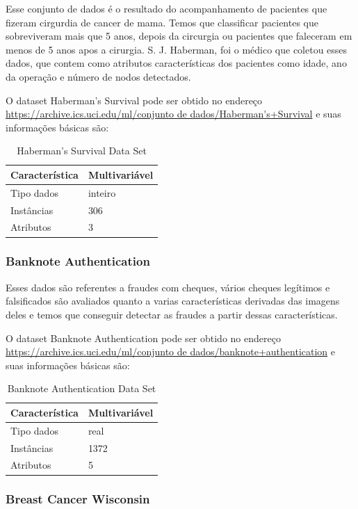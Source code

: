 \documentclass[12pt, a4paper]{article}
\begin{document}
Esse conjunto de dados é o resultado do acompanhamento de pacientes que fizeram cirgurdia de cancer de mama. Temos que classificar pacientes que sobreviveram mais que 5 anos, depois da circurgia ou pacientes que faleceram em menos de 5 anos apos a cirurgia. S. J. Haberman, foi o médico que coletou esses dados, que contem como atributos características dos pacientes como idade, ano da operação e número de nodos detectados.

O dataset Haberman's Survival pode ser obtido no endereço \url{https://archive.ics.uci.edu/ml/conjunto de dados/Haberman's+Survival} e suas informações básicas são:
\begin{table}[!ht]
\centering
\caption{Haberman's Survival Data Set}
\label{habermanstable}
\begin{tabular}{|l|l|}
\hline
Característica & Multivariável\\
\hline
Tipo dados & inteiro\\
\hline
Instâncias & 306\\
\hline
Atributos & 3\\
\hline
\end{tabular}
\end{table}

\subsubsection{Banknote Authentication}

Esses dados são referentes a fraudes com cheques, vários cheques legítimos e falsificados são avaliados quanto a varias características derivadas das imagens deles e temos que conseguir detectar as fraudes a partir dessas características.

O dataset Banknote Authentication pode ser obtido no endereço \url{https://archive.ics.uci.edu/ml/conjunto de dados/banknote+authentication} e suas informações básicas são:
\begin{table}[!ht]
\centering
\caption{Banknote Authentication Data Set}
\label{banknotetable}
\begin{tabular}{|l|l|}
\hline
Característica & Multivariável\\
\hline
Tipo dados & real\\
\hline
Instâncias & 1372\\
\hline
Atributos & 5\\
\hline
\end{tabular}
\end{table}

\subsubsection{Breast Cancer Wisconsin}
\end{document}
